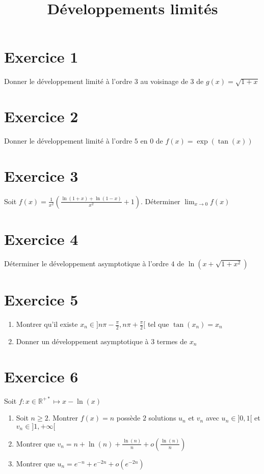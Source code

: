\documentclass[11pt]{article}
\author{\Name \texttt{\Login}}
\date{}
\title{Développements limités}
\begin{document}
\maketitle

\section*{Exercice 1}

Donner le développement limité à l'ordre $3$ au voisinage de $3$ de $g(x)=\sqrt{1+x}$

\section*{Exercice 2}

Donner le développement limité à l'ordre $5$ en $0$ de $f(x)=\exp(\tan(x))$

\section*{Exercice 3}

Soit $f(x)=\frac{1}{x^2}(\frac{\ln(1+x)+\ln(1-x)}{x^2}+1)$. Déterminer $\lim_{x\to0} f(x)$

\section*{Exercice 4}

Déterminer le développement asymptotique à l'ordre $4$ de $\ln(x+\sqrt{1+x^2})$

\section*{Exercice 5}
\begin{enumerate}
\item Montrer qu'il existe $x_n\in ]n\pi -\frac{\pi}{2}, n\pi +\frac{\pi}{2}[$ tel que $\tan(x_n)=x_n$
\item Donner un développement asymptotique à $3$ termes de $x_n$
\end{enumerate}

\section*{Exercice 6}

Soit $f:x\in\mathbb{R}^{+*} \mapsto x-\ln(x)$

\begin{enumerate}
\item Soit $n\geq2$. Montrer $f(x)=n$ possède $2$ solutions $u_n$ et $v_n$ avec $u_n\in]0,1[$ et $v_n\in ]1,+\infty[$
\item Montrer que $v_n= n+\ln(n)+\frac{\ln(n)}{n} + o(\frac{\ln(n)}{n})$
\item Montrer que $u_n= e^{-n} + e^{-2n} +o(e^{-2n})$
\end{enumerate}
\end{document}
